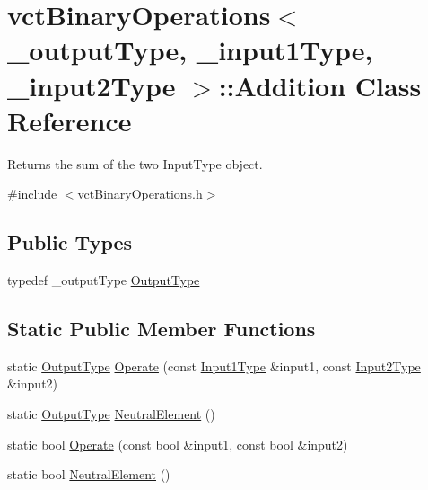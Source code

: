 \hypertarget{classvct_binary_operations_1_1_addition}{}\section{vct\+Binary\+Operations$<$ \+\_\+output\+Type, \+\_\+input1\+Type, \+\_\+input2\+Type $>$\+:\+:Addition Class Reference}
\label{classvct_binary_operations_1_1_addition}


Returns the sum of the two Input\+Type object.  




{\ttfamily \#include $<$vct\+Binary\+Operations.\+h$>$}

\subsection*{Public Types}
\begin{DoxyCompactItemize}
\item 
typedef \+\_\+output\+Type \hyperlink{classvct_binary_operations_1_1_addition_a2de5d1a14345e7ff12fe79a822941a39}{Output\+Type}
\end{DoxyCompactItemize}
\subsection*{Static Public Member Functions}
\begin{DoxyCompactItemize}
\item 
static \hyperlink{classvct_binary_operations_1_1_addition_a2de5d1a14345e7ff12fe79a822941a39}{Output\+Type} \hyperlink{classvct_binary_operations_1_1_addition_a03e03d9895f4c6cd0e5ade01e22279df}{Operate} (const \hyperlink{classvct_binary_operations_a5e56a66a012d6a28c539a08a0021c45e}{Input1\+Type} \&input1, const \hyperlink{classvct_binary_operations_a929119af557a04a16b4d854981e49e1b}{Input2\+Type} \&input2)
\item 
static \hyperlink{classvct_binary_operations_1_1_addition_a2de5d1a14345e7ff12fe79a822941a39}{Output\+Type} \hyperlink{classvct_binary_operations_1_1_addition_a8528b955a8c147436cb96cca50a5b73f}{Neutral\+Element} ()
\item 
static bool \hyperlink{classvct_binary_operations_1_1_addition_a16fa84f898dcfa2910df990e48efb559}{Operate} (const bool \&input1, const bool \&input2)
\item 
static bool \hyperlink{classvct_binary_operations_1_1_addition_a76415fbc90c8497b7d587f3a60609b0a}{Neutral\+Element} ()
\end{DoxyCompactItemize}


